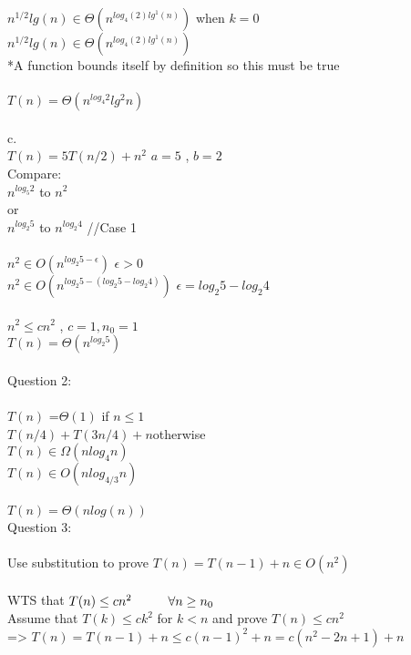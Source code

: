 \documentclass[12pt]{article}
\newcommand\tab[1][1cm]{\hspace*{#1}}
\begin{document}
\tab\tab $n^{1/2} lg(n) \in \Theta (n^{log_4 (2) lg^1 (n)})$ \tab when $k = 0$\\
\tab\tab $n^{1/2} lg(n) \in \Theta (n^{log_4 (2) lg^1 (n)})$\\
*A function bounds itself by definition so this must be true\\\\
\tab\tab $T(n) = \Theta (n^{log_4 2} lg^2 n)$\\\\
c.\\
\tab\tab $T(n) = 5T(n/2) + n^2$ \tab $a = 5$ , $b =2$\\
\tab\tab Compare: \\
\tab\tab $n^{log_5 2}$ to $n^2$\\
\tab\tab \tab or \\
\tab\tab $n^{log_2 5}$ to $n^{log_2 4}$ //Case 1\\\\
\tab\tab $n^2 \in O(n^{log_2 5 -\epsilon})$ \tab $\epsilon >0$\\
\tab\tab $n^2 \in O(n^{log_2 5 -(log_2 5 - log_2 4)})$ \tab $\epsilon = log_2 5 - log_2 4$\\\\
\tab\tab $n^2 \leq cn^2$ \tab , $c=1, n_0 =1$\\
\tab\tab $ T(n) = \Theta (n^{log_2 5})$\\\\
Question 2:\\\\
$T(n)$ =\:\:\:\:\:$\Theta (1)$ \tab if $n\leq 1$\\
\tab\tab $T(n/4) + T(3n/4)+ n $\tab otherwise\\
\vspace{100mm}
\vfill 
\tab $T(n) \in \Omega(n log_4 n)$\\
\tab\tab $T(n) \in O(n log_{4/3} n)$\\\\
\tab\tab $T(n) = \Theta(n log(n))$\\
Question 3:\\\\
\tab\tab Use substitution to prove $T(n) = T(n-1)+n \in O(n^2)$\\\\
\tab\tab WTS that $T(n) \leq cn^2 \tab \forall n\ge n_0$ \\
\tab\tab Assume that $T(k) \leq ck^2$ for $k< n$ and prove $T(n) \leq cn^2$\\
\tab\tab => $T(n) = T(n-1) + n \leq c(n-1)^2 +n = c(n^2-2n+1)+n$\\
\end{document}
